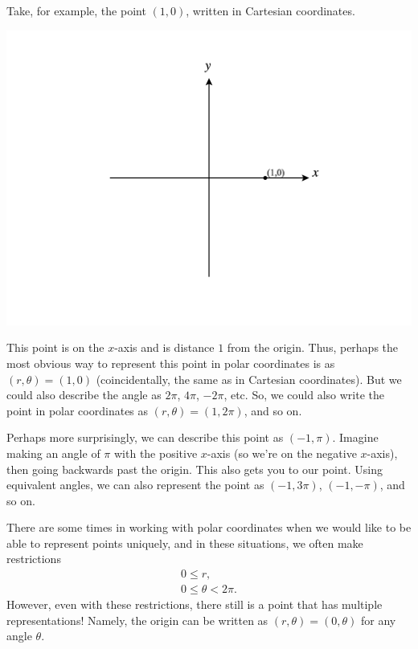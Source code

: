 \documentclass{ximera}
\begin{document}
Take, for example, the point $(1,0)$, written in Cartesian coordinates.

\begin{image}
\includegraphics[width=\textwidth]{CalcPlot3D-pt_10}
\end{image}

This point is on the $x$-axis and is distance $1$ from the origin. Thus, perhaps the most obvious way to represent this point in polar coordinates is as $(r,\theta) = (1,0)$ (coincidentally, the same as in Cartesian coordinates). But we could also describe the angle as $2\pi$, $4\pi$, $-2\pi$, etc. So, we could also write the point in polar coordinates as $(r,\theta) = (1,2\pi)$, and so on.

Perhaps more surprisingly, we can describe this point as $(-1,\pi)$. Imagine making an angle of $\pi$ with the positive $x$-axis (so we're on the negative $x$-axis), then going backwards past the origin. This also gets you to our point. Using equivalent angles, we can also represent the point as $(-1,3\pi)$, $(-1, -\pi)$, and so on.

There are some times in working with polar coordinates when we would like to be able to represent points uniquely, and in these situations, we often make restrictions
\[
\begin{array}{c}
0\leq r,\\
0\leq \theta < 2\pi.
\end{array}
\]
However, even with these restrictions, there still is a point that has multiple representations! Namely, the origin can be written as $(r,\theta) = (0,\theta)$ for any angle $\theta$.
\end{document}
